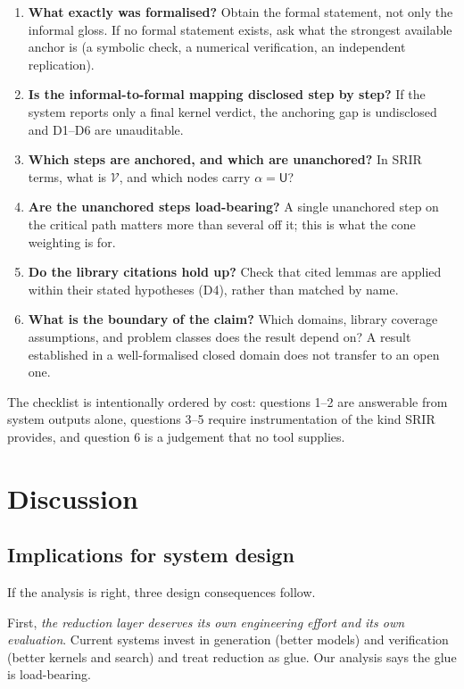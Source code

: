 \documentclass[11pt,a4paper]{article}
\theoremstyle{definition}
\theoremstyle{plain}
\theoremstyle{remark}
\newcommand{\V}{\mathcal{V}}           %
\begin{document}
\begin{enumerate}
  \item \textbf{What exactly was formalised?} Obtain the formal statement, not
        only the informal gloss. If no formal statement exists, ask what the
        strongest available anchor is (a symbolic check, a numerical
        verification, an independent replication).
  \item \textbf{Is the informal-to-formal mapping disclosed step by step?} If
        the system reports only a final kernel verdict, the anchoring gap is
        undisclosed and D1--D6 are unauditable.
  \item \textbf{Which steps are anchored, and which are unanchored?} In SRIR
        terms, what is $\V$, and which nodes carry $\alpha = \mathsf{U}$?
  \item \textbf{Are the unanchored steps load-bearing?} A single unanchored
        step on the critical path matters more than several off it; this is what
        the cone weighting is for.
  \item \textbf{Do the library citations hold up?} Check that cited lemmas are
        applied within their stated hypotheses (D4), rather than matched by
        name.
  \item \textbf{What is the boundary of the claim?} Which domains, library
        coverage assumptions, and problem classes does the result depend on? A
        result established in a well-formalised closed domain does not transfer
        to an open one.
\end{enumerate}

The checklist is intentionally ordered by cost: questions 1--2 are answerable
from system outputs alone, questions 3--5 require instrumentation of the kind
SRIR provides, and question 6 is a judgement that no tool supplies.

\section{Discussion}
\label{sec:discussion}

\subsection{Implications for system design}

If the analysis is right, three design consequences follow.

First, \emph{the reduction layer deserves its own engineering effort and its own
evaluation}. Current systems invest in generation (better models) and
verification (better kernels and search) and treat reduction as glue. Our
analysis says the glue is load-bearing.
\end{document}

